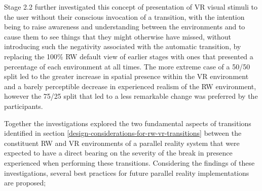Stage 2.2 further investigated this concept of presentation of VR visual stimuli to the user without their conscious invocation of a transition, with the intention being to raise awareness and understanding between the environments and to cause them to see things that they might otherwise have missed, without introducing such the negativity associated with the automatic transition, by replacing the 100\% RW default view of earlier stages with ones that presented a percentage of each environment at all times. The more extreme case of a 50/50 split led to the greater increase in spatial presence within the VR environment and a barely perceptible decrease in experienced realism of the RW environment, however the 75/25 split that led to a less remarkable change was preferred by the participants.

Together the investigations explored the two fundamental aspects of transitions identified in section \ref{design-considerations-for-rw-vr-transitions} between the constituent RW and VR environments of a parallel reality system that were expected to have a direct bearing on the severity of the break in presence experienced when performing these transitions. Considering the findings of these investigations, several best practices for future parallel reality implementations are proposed;

